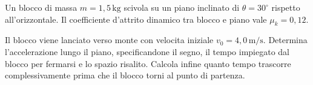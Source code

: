 
\begin{esercizio}
Un blocco di massa \(m = 1{,}5\,\mathrm{kg}\) scivola su un piano inclinato di
\(\theta = 30^\circ\) rispetto all'orizzontale. Il coefficiente d'attrito
dinamico tra blocco e piano vale \(\mu_k = 0{,}12\).

Il blocco viene lanciato verso monte con velocita iniziale
\(v_0 = 4{,}0\,\mathrm{m/s}\). Determina l'accelerazione lungo il piano,
specificandone il segno, il tempo impiegato dal blocco per fermarsi e lo
spazio risalito. Calcola infine quanto tempo trascorre complessivamente prima
che il blocco torni al punto di partenza.
\end{esercizio}

